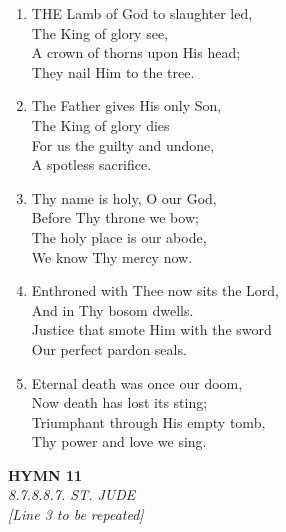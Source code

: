 \documentclass[11pt,a4paper]{article}
\begin{document}
\begin{enumerate}
    \item THE Lamb of God to slaughter led, \\
        The King of glory see, \\
        A crown of thorns upon His head; \\
        They nail Him to the tree.

    \item The Father gives His only Son, \\
        The King of glory dies \\
        For us the guilty and undone, \\
        A spotless sacrifice.

    \item Thy name is holy, O our God, \\
        Before Thy throne we bow; \\
        The holy place is our abode, \\
        We know Thy mercy now.

    \item Enthroned with Thee now sits the Lord, \\
        And in Thy bosom dwells. \\
        Justice that smote Him with the sword \\
        Our perfect pardon seals.

    \item Eternal death was once our doom, \\
        Now death has lost its sting; \\
        Triumphant through His empty tomb, \\
        Thy power and love we sing.

\end{enumerate}

\newpage
\begin{center}
    {\Large \textbf{HYMN 11}}
    \\
    \textit{8.7.8.8.7. ST. JUDE}
    \\
    \textit{\small [Line 3 to be repeated]}
\end{center}
\vspace{1em}
\end{document}
